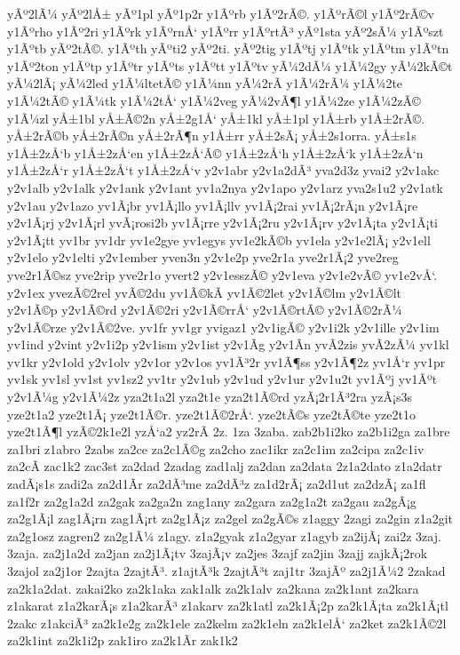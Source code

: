 {yÃº2lÃ¼
yÃº2lÅ±
yÃº1pl
yÃº1p2r
y1Ãºrb
y1Ãº2rÃ©.
y1ÃºrÃ©l
y1Ãº2rÃ©v
y1Ãºrho
y1Ãº2ri
y1Ãºrk
y1ÃºrnÅ‘
y1Ãºrr
y1ÃºrtÃ³
yÃº1sta
yÃº2sÃ¼
y1Ãºszt
y1Ãºtb
yÃº2tÃ©.
y1Ãºth
yÃºti2
yÃº2ti.
yÃº2tig
y1Ãºtj
y1Ãºtk
y1Ãºtm
y1Ãºtn
y1Ãº2ton
y1Ãºtp
y1Ãºtr
y1Ãºts
y1Ãºtt
y1Ãºtv
yÃ¼2dÃ¼
y1Ã¼2gy
yÃ¼2kÃ©t
yÃ¼2lÃ¡
yÃ¼2led
y1Ã¼ltetÃ©
y1Ã¼nn
yÃ¼2rÃ­
y1Ã¼2rÃ¼
y1Ã¼2te
y1Ã¼2tÃ©
y1Ã¼tk
y1Ã¼2tÅ‘
y1Ã¼2veg
yÃ¼2vÃ¶l
y1Ã¼2ze
y1Ã¼2zÃ©
y1Ã¼zl
yÅ±1bl
yÅ±Ã©2n
yÅ±2g1Å‘
yÅ±1kl
yÅ±1pl
y1Å±rb
y1Å±2rÃ©.
yÅ±2rÃ©b
yÅ±2rÃ©n
yÅ±2rÃ¶n
y1Å±rr
yÅ±2sÃ¡
yÅ±2s1orra.
yÅ±s1s
y1Å±2zÅ‘b
y1Å±2zÅ‘en
y1Å±2zÅ‘Ã©
y1Å±2zÅ‘h
y1Å±2zÅ‘k
y1Å±2zÅ‘n
y1Å±2zÅ‘r
y1Å±2zÅ‘t
y1Å±2zÅ‘v
y2v1abr
y2v1a2dÃ³
yva2d3z
yvai2
y2v1akc
y2v1alb
y2v1alk
y2v1ank
y2v1ant
yv1a2nya
y2v1apo
y2v1arz
yva2s1u2
y2v1atk
y2v1au
y2v1azo
yv1Ã¡br
yv1Ã¡llo
yv1Ã¡llv
yv1Ã¡2rai
yv1Ã¡2rÃ¡n
y2v1Ã¡re
y2v1Ã¡rj
y2v1Ã¡rl
yvÃ¡rosi2b
yv1Ã¡rre
y2v1Ã¡2ru
y2v1Ã¡rv
y2v1Ã¡ta
y2v1Ã¡ti
y2v1Ã¡tt
yv1br
yv1dr
yv1e2gye
yv1egys
yv1e2kÃ©b
yv1ela
y2v1e2lÃ¡
y2v1ell
y2v1elo
y2v1elti
y2v1ember
yven3n
y2v1e2p
yve2r1a
yve2r1Ã¡2
yve2reg
yve2r1Ã©sz
yve2rip
yve2r1o
yvert2
y2v1esszÃ©
y2v1eva
y2v1e2vÃ©
yv1e2vÅ‘.
y2v1ex
yvezÃ©2rel
yvÃ©2du
yv1Ã©kÃ­
yv1Ã©2let
y2v1Ã©lm
y2v1Ã©lt
y2v1Ã©p
y2v1Ã©rd
y2v1Ã©2ri
y2v1Ã©rrÅ‘
y2v1Ã©rtÃ©
y2v1Ã©2rÃ¼
y2v1Ã©rze
y2v1Ã©2ve.
yv1fr
yv1gr
yvigaz1
y2v1igÃ©
y2v1i2k
y2v1ille
y2v1im
yv1ind
y2vint
y2v1i2p
y2v1ism
y2v1ist
y2v1Ã­g
y2v1Ã­n
yvÃ­2zis
yvÃ­2zÃ¼
yv1kl
yv1kr
y2v1old
y2v1olv
y2v1or
y2v1os
yv1Ã³2r
yv1Ã¶ss
y2v1Ã¶2z
yv1Å‘r
yv1pr
yv1sk
yv1sl
yv1st
yv1sz2
yv1tr
y2v1ub
y2v1ud
y2v1ur
y2v1u2t
yv1Ãºj
yv1Ãºt
y2v1Ã¼g
y2v1Ã¼2z
yza2t1a2l
yza2t1e
yza2t1Ã©rd
yzÃ¡2r1Ã³2ra
yzÃ¡s3s
yze2t1a2
yze2t1Ã¡
yze2t1Ã©r.
yze2t1Ã©2rÅ‘.
yze2tÃ©s
yze2tÃ©te
yze2t1o
yze2t1Ã¶l
yzÃ©2k1e2l
yzÅ‘a2
yz2rÃ­
2z.
1za
3zaba.
zab2b1i2ko
za2b1i2ga
za1bre
za1bri
z1abro
2zabs
za2ce
za2c1Ã©g
za2cho
zac1ikr
za2c1im
za2cipa
za2c1iv
za2cÃ­
zac1k2
zac3st
za2dad
2zadag
zad1alj
za2dan
za2data
2z1a2dato
z1a2datr
zadÃ¡s1s
zadi2a
za2d1Ã­r
za2dÃ³me
za2dÃ³z
za1d2rÃ¡
za2d1ut
za2dzÃ¡
za1fl
za1f2r
za2g1a2d
za2gak
za2ga2n
zag1any
za2gara
za2g1a2t
za2gau
za2gÃ¡g
za2g1Ã¡l
zag1Ã¡rn
zag1Ã¡rt
za2g1Ã¡z
za2gel
za2gÃ©s
z1aggy
2zagi
za2gin
z1a2git
za2g1osz
zagren2
za2g1Ã¼
z1agy.
z1a2gyak
z1a2gyar
z1agyb
za2ijÃ¡
zai2z
3zaj.
3zaja.
za2j1a2d
za2jan
za2j1Ã¡tv
3zajÃ¡v
za2jes
3zajf
za2jin
3zajj
zajkÃ¡2rok
3zajol
za2j1or
2zajta
2zajtÃ³.
z1ajtÃ³k
2zajtÃ³t
zaj1tr
3zajÃº
za2j1Ã¼2
2zakad
za2k1a2dat.
zakai2ko
za2k1aka
zak1alk
za2k1alv
za2kana
za2k1ant
za2kara
z1akarat
z1a2karÃ¡s
z1a2karÃ³
z1akarv
za2k1atl
za2k1Ã¡2p
za2k1Ã¡ta
za2k1Ã¡tl
2zakc
z1akciÃ³
za2k1e2g
za2k1ele
za2kelm
za2k1eln
za2k1elÅ‘
za2ket
za2k1Ã©2l
za2k1int
za2k1i2p
zak1iro
za2k1Ã­r
zak1k2
}
